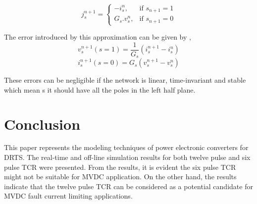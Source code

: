 \documentclass[journal]{IEEEtran}
\begin{document}
\begin{equation}
\label{eq:A1}
j_{s}^{n+1}=
\begin{cases}
  -i_{s}^{n}, & \text{if } s_{n+1}=1\\
  G_s.v_s^n, & \text{if } s_{n+1}=0
\end{cases}
\end{equation}

The error introduced by this approximation can be given by \cite{pejovic1994method},
\begin{equation}
\label{eq:A2}
v_s^{n+1} (s=1) = \frac{1}{G_s} (i_s^{n+1}-i_s^n)
\end{equation}
\begin{equation}
\label{eq:A3}
i_s^{n+1} (s=0) = {G_s} (v_s^{n+1}-v_s^n)
\end{equation}

These errors can be negligible if the network is linear, time-invariant and stable which mean s it should have all the poles in the left half plane.








\section{Conclusion}
This paper represents the modeling techniques of power electronic converters for DRTS. The real-time and off-line simulation results for both twelve pulse and six pulse TCR were presented. From the results, it is evident the six pulse TCR might not be suitable for MVDC application. On the other hand, the results indicate that the twelve pulse TCR can be considered as a potential candidate for MVDC fault current limiting applications.




\ifCLASSOPTIONcaptionsoff
  \newpage
\fi
\end{document}
